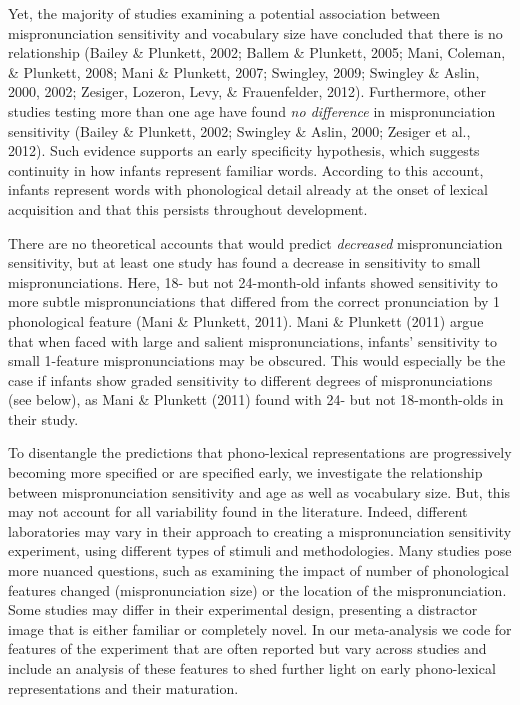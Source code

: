 \documentclass[
  man, noextraspace]{apa6}
\begin{document}
Yet, the majority of studies examining a potential association between mispronunciation sensitivity and vocabulary size have concluded that there is no relationship (Bailey \& Plunkett, 2002; Ballem \& Plunkett, 2005; Mani, Coleman, \& Plunkett, 2008; Mani \& Plunkett, 2007; Swingley, 2009; Swingley \& Aslin, 2000, 2002; Zesiger, Lozeron, Levy, \& Frauenfelder, 2012). Furthermore, other studies testing more than one age have found \emph{no difference} in mispronunciation sensitivity (Bailey \& Plunkett, 2002; Swingley \& Aslin, 2000; Zesiger et al., 2012). Such evidence supports an early specificity hypothesis, which suggests continuity in how infants represent familiar words. According to this account, infants represent words with phonological detail already at the onset of lexical acquisition and that this persists throughout development.

There are no theoretical accounts that would predict \emph{decreased} mispronunciation sensitivity, but at least one study has found a decrease in sensitivity to small mispronunciations. Here, 18- but not 24-month-old infants showed sensitivity to more subtle mispronunciations that differed from the correct pronunciation by 1 phonological feature (Mani \& Plunkett, 2011). Mani \& Plunkett (2011) argue that when faced with large and salient mispronunciations, infants' sensitivity to small 1-feature mispronunciations may be obscured. This would especially be the case if infants show graded sensitivity to different degrees of mispronunciations (see below), as Mani \& Plunkett (2011) found with 24- but not 18-month-olds in their study.

To disentangle the predictions that phono-lexical representations are progressively becoming more specified or are specified early, we investigate the relationship between mispronunciation sensitivity and age as well as vocabulary size. But, this may not account for all variability found in the literature. Indeed, different laboratories may vary in their approach to creating a mispronunciation sensitivity experiment, using different types of stimuli and methodologies. Many studies pose more nuanced questions, such as examining the impact of number of phonological features changed (mispronunciation size) or the location of the mispronunciation. Some studies may differ in their experimental design, presenting a distractor image that is either familiar or completely novel. In our meta-analysis we code for features of the experiment that are often reported but vary across studies and include an analysis of these features to shed further light on early phono-lexical representations and their maturation.
\end{document}
